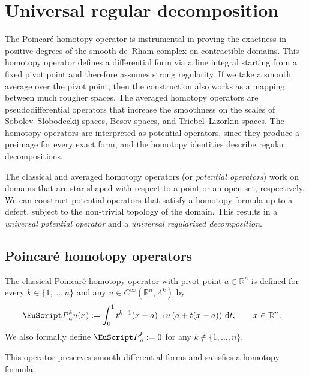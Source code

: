 \documentclass[10pt,a4paper]{amsart}
\theoremstyle{definition}
\theoremstyle{remark}
\numberwithin{equation}{section}
\newcommand{\bbR}{{\mathbb R}}
\newcommand{\euP}{{\EuScript P}}
\newcommand{\dif}{{\mathrm d}}
\newcommand{\contract}{\mathbin{\lrcorner}}
\newcommand{\Alt}[1]{\Lambda^{#1}}
\newcommand{\Poincare}{\euP}
\begin{document}
\section{Universal regular decomposition}\label{section:regular-decomposition}

The Poincar\'e homotopy operator is instrumental in proving the exactness in positive degrees of the smooth de~Rham complex on contractible domains. 
This homotopy operator defines a differential form via a line integral starting from a fixed pivot point and therefore assumes strong regularity.
If we take a smooth average over the pivot point, then the construction also works as a mapping between much rougher spaces. 
The averaged homotopy operators are pseudodifferential operators that increase the smoothness on the scales of Sobolev--Slobodeckij spaces, Besov spaces, and Triebel--Lizorkin spaces. 
The homotopy operators are interpreted as potential operators, since they produce a preimage for every exact form,
and the homotopy identities describe regular decompositions. 

The classical and averaged homotopy operators (or \emph{potential operators}) work on domains that are star-shaped with respect to a point or an open set, respectively. 
We can construct potential operators that satisfy a homotopy formula up to a defect, subject to the non-trivial topology of the domain. 
This results in a \emph{universal potential operator} and a \emph{universal regularized decomposition}.

\subsection{Poincar\'e homotopy operators}

The classical Poincar\'e homotopy operator with pivot point $a \in \bbR^{n}$ is defined for every $k \in \{1,\dots,n\}$ and any $u \in C^{\infty}(\bbR^{n},\Alt{k})$ by 
\begin{align*}
    \Poincare^{k}_{a} u(x)
    &:=
    \int_{0}^{1} t^{k-1} (x-a)\contract u\left(a+t(x-a)\right)\,\dif t
    ,
    \qquad
    x \in \bbR^{n}.
\end{align*}
We also formally define $\Poincare^{k}_{a} := 0$ for any $k \notin \{ 1, \dots, n \}$. 

This operator preserves smooth differential forms and satisfies a homotopy formula.
\end{document}
